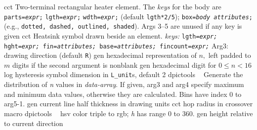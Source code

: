   {cct}%
  {Two-terminal rectangular heater element.
    The {\sl keys} for the body are
    {\tt parts={\sl expr};}
    {\tt lgth={\sl expr};}
    {\tt wdth={\sl expr};} (default {\tt lgth*2/5});
    {\tt box={\sl body attributes};}
      (e.g., {\tt dotted, dashed, outlined, shaded}).
    Args 3--5 are unused if any key is given}%
%
  {cct}%
  {Heatsink symbol drawn beside an element.
   {\sl keys:} {\tt lgth={\sl expr;} hght={\sl expr;} fin={\sl attributes;}
     base={\sl attributes;} fincount={\sl expr;}}
     Arg3: drawing direction (default {\tt R}) }%
%
  {gen}%
  {hexadecimal representation of $n,$ left padded to $m$ digits if the second
   argument is nonblank}%
%
  {gen}%
  {hexadecimal digit for $0 \leq n < 16$}%
%
  {log}%
  {hysteresis symbol dimension in {\tt L\_unit}s, default 2}%
%
  {dpictools}%
  {$\;\;$ Generate the distribution of {\sl n} values in {\sl data-array}.
    If given, arg3 and arg4 specify maximum and minimum data values,
    otherwise they are calculated. Bins have index 0 to arg5-1.}%
%
  {gen}%
  {current line half thickness in drawing units}%
%
  {cct}%
  {hop radius in crossover macro}%
%
  {dpictools}%
  {$\;\;$ hsv color triple to rgb; {\sl h} has range 0 to 360.}%
%
  {gen}%
  {height relative to current direction}%

%


